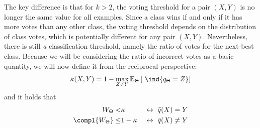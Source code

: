 \documentclass[../main.tex]{subfiles}
\begin{document}
The key difference is that for $k>2$, the voting threshold for a pair $(X,Y)$ is no longer the same value for all examples. Since a class wins if and only if it has more votes than any other class, the voting threshold depends on the distribution of class votes, which is potentially different for any pair $(X,Y)$. Nevertheless, there is still \textit{a} classification threshold, namely the ratio of votes for the next-best class. Because we will be considering the ratio of incorrect votes as a basic quantity, we will now define it from the reciprocal perspective:
$$
\kappa (X,Y) = 1 - \max_{Z \not= Y} \mathbb{E}_{\Theta}\left[ ~\ind{q_{\Theta} = Z} \right] 
$$
and it holds that
\begin{align}
\label{eq:gen-error-nonbinary}
W_{\Theta} <& \kappa  & ~\leftrightarrow~ \bar{q}(X) = Y \\ 
\compl{W_{\Theta}} \leq& 1-\kappa  & ~\leftrightarrow~ \bar{q}(X) \not= Y
\end{align}
\end{document}
